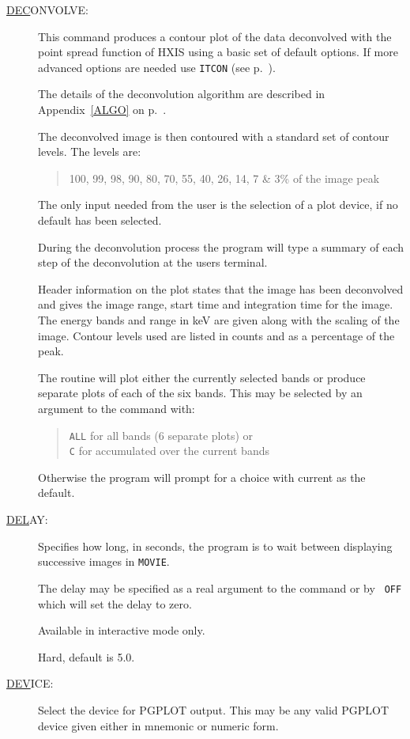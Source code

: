 \begin{description}
\item[\underline{DEC}ONVOLVE: ] \label{dec}
This command produces a contour plot of the data deconvolved with the
point spread function of HXIS using a basic set of default options. If
more advanced options are needed use {\tt ITCON} (see p.~\pageref{it}).

The details of the deconvolution algorithm are described in
Appendix~\ref{ALGO} on p.~\pageref{ALGO}.

The deconvolved image is then contoured with a standard set of contour
levels.  The levels are:
\begin{quote}
100, 99, 98, 90, 80, 70, 55, 40, 26, 14, 7 \& 3\% of the image peak
\end{quote}

The only input needed from the user is the selection of a plot device,
if no default has been selected.

During the deconvolution process the program will type a summary of
each step of the deconvolution at the users terminal.

Header information on the plot states that the image has been
deconvolved and gives the image range, start time and integration time
for the image. The energy bands and range in keV are given along with
the scaling of the image. Contour levels used are listed in counts and
as a percentage of the peak.

The routine will plot either the currently selected bands or produce
separate plots of each of the six bands.  This may be selected by an
argument to the command with:
\begin{quote}
{\tt ALL} for all bands (6 separate plots) or\\ {\tt C} for accumulated
over the current bands
\end{quote}
Otherwise the program will prompt for a choice with current as the
default.

\item[\underline{DEL}AY: ] \label{del}
Specifies how long, in seconds, the program is to wait between
displaying successive images in {\tt MOVIE}.

The delay may be specified as a real argument to the command or by {\tt
OFF} which will set the delay to zero.

Available in interactive mode only.

Hard, default is 5.0.

\item[\underline{DEV}ICE: ] \label{dev}
Select the device for PGPLOT output. This may be any valid PGPLOT
device given either in mnemonic or numeric form.


\end{description}

